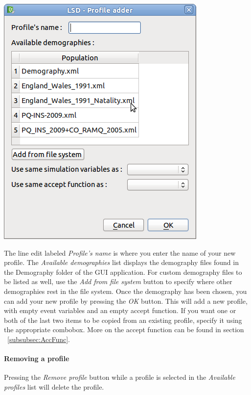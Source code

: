 \documentclass[a4paper,11pt]{report}
\begin{document}
\begin{center}
\includegraphics[scale=0.3]{Pictures/Population/Submenu/ProAdder.png}
\label{fig:proAdder}
\end{center}

The line edit labeled \emph{Profile's name} is where you enter the name of your new profile. The \emph{Available demographies} list displays the demography files found in the Demography folder of the GUI application. For custom demography files to be listed as well, use the \emph{Add from file system} button to specify where other demographies rest in the file system. Once the demography has been chosen, you can add your new profile by pressing the \emph{OK} button. This will add a new profile, with empty event variables and an empty accept function. If you want one or both of the last two items to be copied from an existing profile, specify it using the appropriate combobox. More on the accept function can be found in section ~\ref{subsubsec:AccFunc}.

\paragraph{Removing a profile}
Pressing the \emph{Remove profile} button while a profile is selected in the \emph{Available profiles} list will delete the profile.
\end{document}
